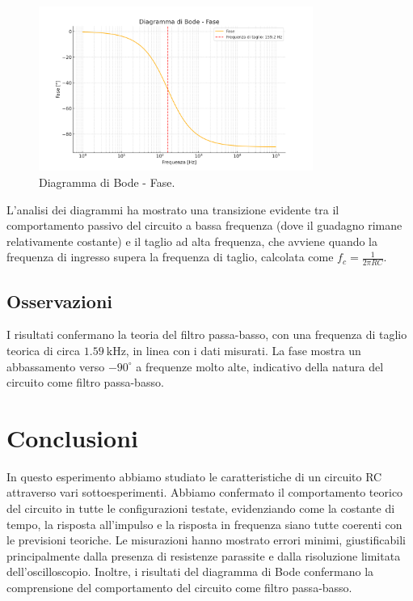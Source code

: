 \documentclass[a4paper,12pt]{article}
\begin{document}
\begin{figure}[H]
\centering
\includegraphics[width=0.8\textwidth]{assets/bode_phase.png}
\caption{Diagramma di Bode - Fase.}
\end{figure}

L'analisi dei diagrammi ha mostrato una transizione evidente tra il comportamento passivo del circuito a bassa frequenza (dove il guadagno rimane relativamente costante) e il taglio ad alta frequenza, che avviene quando la frequenza di ingresso supera la frequenza di taglio, calcolata come \( f_c = \frac{1}{2 \pi RC} \).

\subsection{Osservazioni}
I risultati confermano la teoria del filtro passa-basso, con una frequenza di taglio teorica di circa \(\SI{1.59}{\kilo\hertz}\), in linea con i dati misurati. La fase mostra un abbassamento verso \(-90^\circ\) a frequenze molto alte, indicativo della natura del circuito come filtro passa-basso.




\section{Conclusioni}
In questo esperimento abbiamo studiato le caratteristiche di un circuito RC attraverso vari sottoesperimenti. Abbiamo confermato il comportamento teorico del circuito in tutte le configurazioni testate, evidenziando come la costante di tempo, la risposta all'impulso e la risposta in frequenza siano tutte coerenti con le previsioni teoriche. Le misurazioni hanno mostrato errori minimi, giustificabili principalmente dalla presenza di resistenze parassite e dalla risoluzione limitata dell'oscilloscopio. Inoltre, i risultati del diagramma di Bode confermano la comprensione del comportamento del circuito come filtro passa-basso.
\end{document}

